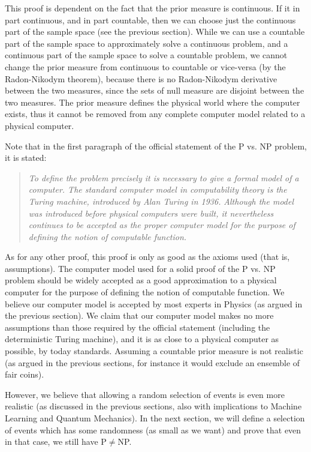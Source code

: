 \documentclass[11pt,a4paper]{report}
\begin{document}
This proof is dependent on the fact that the prior measure is
continuous. If it in part continuous, and in part countable, then we can
choose just the continuous part of the sample space (see the previous
section). While we can use a countable part of the sample space to
approximately solve a continuous problem, and a continuous part of the
sample space to solve a countable problem, we cannot change the prior
measure from continuous to countable or vice-versa (by the Radon-Nikodym
theorem), because there is no Radon-Nikodym derivative between the two
measures, since the sets of null measure are disjoint between the two
measures. The prior measure defines the physical world where the
computer exists, thus it cannot be removed from any complete computer
model related to a physical computer.

Note that in the first paragraph of the official statement of the P vs.
NP problem\cite{pvsnp}, it is stated:

\begin{quote}
\emph{To define the problem precisely it is necessary to give a formal
model of a computer. The standard computer model in computability theory
is the Turing machine, introduced by Alan Turing in 1936.}
\emph{Although the model was introduced before physical computers were
built, it nevertheless continues to be accepted as the proper computer
model for the purpose of defining the notion of computable function.}
\end{quote}

As for any other proof, this proof is only as good as the axioms used
(that is, assumptions). The computer model used for a solid proof of the
P vs. NP problem should be widely accepted as a good approximation to a
physical computer for the purpose of defining the notion of computable
function. We believe our computer model is accepted by most experts in
Physics (as argued in the previous section). We claim that our computer
model makes no more assumptions than those required by the official
statement\cite{pvsnp} (including the
deterministic Turing machine), and it is as close to a physical computer
as possible, by today standards. Assuming a countable prior measure is
not realistic (as argued in the previous sections, for instance it would
exclude an ensemble of fair coins).

However, we believe that allowing a random selection of events is even
more realistic (as discussed in the previous sections, also with
implications to Machine Learning and Quantum Mechanics). In the next
section, we will define a selection of events which has some randomness
(as small as we want) and prove that even in that case, we still have
P\(\neq\)NP.
\end{document}
